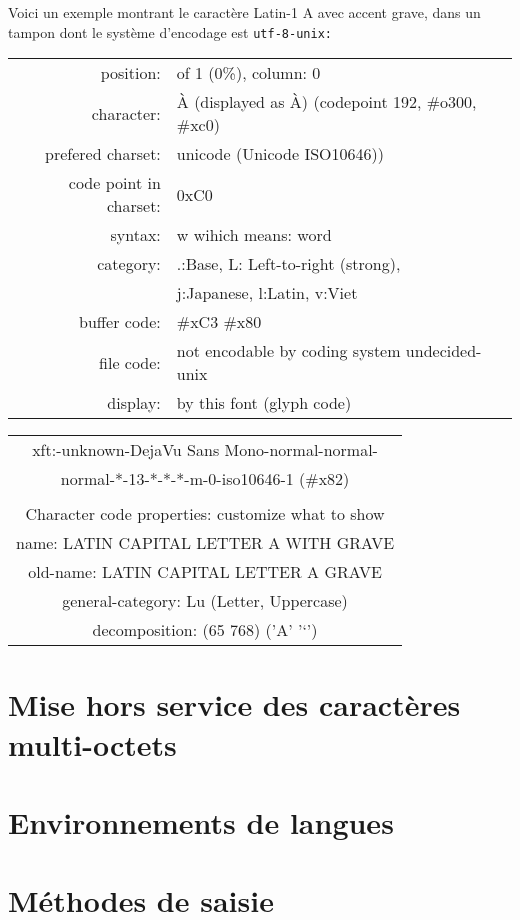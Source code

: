 Voici un exemple montrant le caractère Latin-1 A avec accent grave,
dans un tampon dont le système d'encodage est \texttt{utf-8-unix:}
\begin{center}
  \begin{tabular}[m]{>{\ttfamily}r >{\ttfamily}p{10cm}}
    position: & 1 of 1 (0\%), column: 0 \\
    character:& \`A (displayed as \`A) (codepoint 192, \#o300, \#xc0)
    \\
    prefered charset: & unicode (Unicode ISO10646)) \\
    code point in charset: & 0xC0 \\
    syntax: & w \quad wihich means: word \\
    category: & .:Base, L: Left-to-right (strong),\\
              & j:Japanese, l:Latin, v:Viet \\
    buffer code: & \#xC3 \#x80 \\
    file code: & not encodable by coding system undecided-unix \\
    display: & by this font (glyph code)
  \end{tabular}
  \begin{tabular}[m]{>{\ttfamily}c}
    xft:-unknown-DejaVu Sans Mono-normal-normal-\\
    normal-*-13-*-*-*-m-0-iso10646-1 (\#x82)\\
    \\
    Character code properties: customize what to show \\
    name: LATIN CAPITAL LETTER A WITH GRAVE \\
    old-name: LATIN CAPITAL LETTER A GRAVE \\
    general-category: Lu (Letter, Uppercase) \\
    decomposition: (65 768) ('A' '`')
  \end{tabular}
\end{center}
\section{Mise hors service des caractères multi-octets}
\section{Environnements de langues}
\section{Méthodes de saisie}
